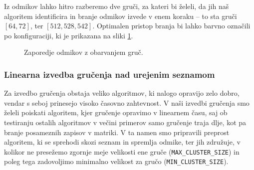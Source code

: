 \documentclass[a4paper,12pt,openright]{book}
\begin{document}
\noindent Iz odmikov lahko hitro razberemo dve gruči, za kateri bi želeli, da jih naš algoritem identificira in branje odmikov izvede v enem koraku – to sta gruči $[64, 72]$, ter $[512, 528, 542]$. Optimalen pristop branja bi lahko barvno označili po konfiguraciji, ki je prikazana na sliki \ref{colored_clusters}.

\hfill \break
\begin{figure}[H]
\begin{center}
\caption{Zaporedje odmikov z obarvanjem gruč.}
\label{colored_clusters}
\end{center}
\end{figure}
        
        \subsubsection{Linearna izvedba gručenja nad urejenim seznamom}
        Za izvedbo gručenja obstaja veliko algoritmov, ki nalogo opravijo zelo dobro, vendar s seboj prinesejo visoko časovno zahtevnost. V naši izvedbi gručenja smo želeli poiskati algoritem, kjer gručenje opravimo v linearnem času, saj ob testiranju ostalih algoritmov v večini primerov samo gručenje traja dlje, kot pa branje posameznih zapisov v matriki. V ta namen smo pripravili preprost algoritem, ki se sprehodi skozi seznam in spremlja odmike, ter jih združuje, v kolikor ne presežemo zgornje meje velikosti ene gruče ({\tt MAX\_CLUSTER\_SIZE}) in poleg tega zadovoljimo minimalno velikost za gručo ({\tt MIN\_CLUSTER\_SIZE}).
        
\end{document}
